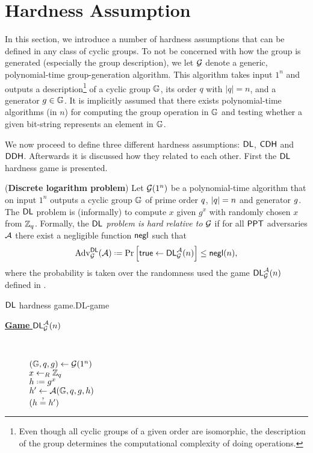 \section{Hardness Assumption}

In this section, we introduce a number of hardness assumptions that can be defined in any class of cyclic groups. To not be concerned with how the group is generated (especially the group description), we let $\operatorname{\mathcal{G}}$ denote a generic, polynomial-time group-generation algorithm. This algorithm takes input $1^n$ and outputs a description\footnote{Even though all cyclic groups of a given order are isomorphic, the description of the group determines the computational complexity of doing operations.} of a cyclic group $\mathbb{G}$, its order $q$ with $\vert q\vert = n$, and a generator $g\in\mathbb{G}$. It is implicitly assumed that there exists polynomial-time algorithms (in $n$) for computing the group operation in $\mathbb{G}$ and testing whether a given bit-string represents an element in $\mathbb{G}$. 

We now proceed to define three different hardness assumptions: $\mathsf{DL}$, $\mathsf{CDH}$ and $\mathsf{DDH}$. Afterwards it is discussed how they related to each other. First the $\mathsf{DL}$ hardness game is presented. 

\begin{defn}
(\textbf{Discrete logarithm problem}) Let $\operatorname{\mathcal{G}}(1^n)$ be a polynomial-time algorithm that on input $1^n$ outputs a cyclic group $\mathbb{G}$ of prime order $q$, $\vert q\vert = n$ and generator $g$. The $\mathsf{DL}$ problem is (informally) to compute $x$ given $g^x$ with randomly chosen $x$ from $\mathbb{Z}_q$. Formally, the \textit{$\mathsf{DL}$ problem is hard relative to} $\operatorname{\mathcal{G}}$ if for all $\mathsf{PPT}$ adversaries $\mathcal{A}$ there exist a negligible function $\operatorname{\mathsf{negl}}$ such that 
\begin{align*}
	\adv_{\groupgen}^{\DL}(\adve)\defeq \prob{\true\leftarrow \DL_{\groupgen}^{\adve}(n)} \leq \negl(n),
\end{align*}
where the probability is taken over the randomness used the game $\mathsf{DL}_{\operatorname{\mathcal{G}}}^{\mathcal{A}}(n)$ defined in .
\end{defn}

\begin{boxfigGame}{$\mathsf{DL}$ hardness game.}{DL-game}
  \begin{description}
	\item[\underline{\textbf{Game} $\mathsf{DL}_{\operatorname{\mathcal{G}}}^{\mathcal{A}}(n)$}] ~
 	
 		$(\mathbb{G},q,g)\leftarrow\operatorname{\mathcal{G}}(1^n)$ \\
 		$x\leftarrow_R \mathbb{Z}_q$ \\
 		$h \defeq g^x$ \\
		$h'\leftarrow\mathcal{A}(\mathbb{G},q,g,h)$ \\
		\Ret $\askequal{h}{h'}$
  \end{description}
\end{boxfigGame}

